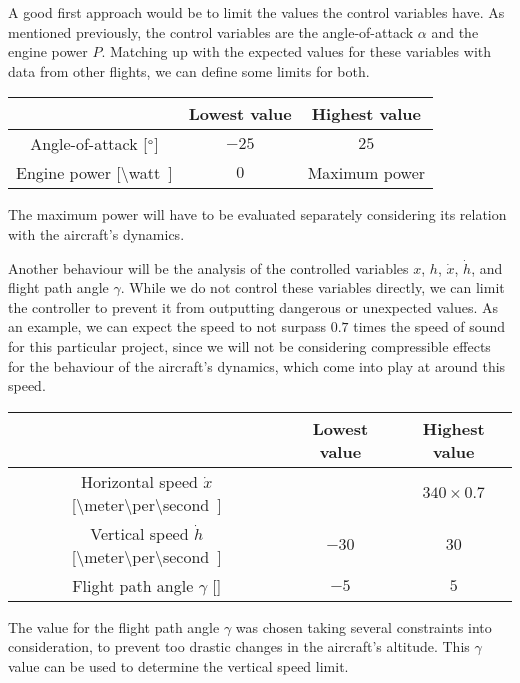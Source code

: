 \documentclass[english,palatino]{ist-report}
\begin{document}
A good first approach would be to limit the values the control variables have. As mentioned previously, the control variables are the angle-of-attack $\alpha$ and the engine power $P$. Matching up with the expected values for these variables with data from other flights, we can define some limits for both.
\begin{table}[ht]
	\begin{tabular}{c|c c} \toprule
									& Lowest value		& Highest value	\\
		\midrule
		Angle-of-attack [$\degree$]	& $-25$				& $25$			\\
		Engine power [\SI{\watt}]	& $0$				& Maximum power	\\
		\bottomrule
	\end{tabular}
\end{table}
The maximum power will have to be evaluated separately considering its relation with the aircraft's dynamics.

Another behaviour will be the analysis of the controlled variables $x$, $h$, $\dot{x}$, $\dot{h}$, and flight path angle $\gamma$. While we do not control these variables directly, we can limit the controller to prevent it from outputting dangerous or unexpected values. As an example, we can expect the speed to not surpass $0.7$ times the speed of sound for this particular project, since we will not be considering compressible effects for the behaviour of the aircraft's dynamics, which come into play at around this speed.
\begin{table}[ht]
	\begin{tabular}{c|c c} \toprule
														& Lowest value		& Highest value		\\
		\midrule
		Horizontal speed $\dot{x}$ [\SI{\meter\per\second}]	& 					& $340 \times 0.7$	\\
		Vertical speed $\dot{h}$ [\SI{\meter\per\second}]		& $-30$				& $30$				\\
		Flight path angle $\gamma$ [\degree]			& $-5$				& $5$				\\
		\bottomrule
	\end{tabular}
\end{table}
The value for the flight path angle $\gamma$ was chosen taking several constraints into consideration, to prevent too drastic changes in the aircraft's altitude. This $\gamma$ value can be used to determine the vertical speed limit.
\end{document}
